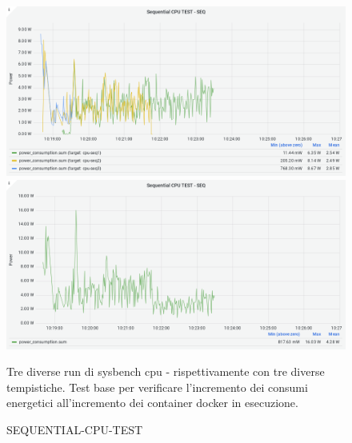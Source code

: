\documentclass[a4paper, 11pt]{article}
\begin{document}
\begin{figure}[h]
\caption{SEQUENTIAL-CPU-TEST}
\centering
\includegraphics[scale=0.4]{image25}
\includegraphics[scale=0.4]{image34}
\begin{flushleft}
Tre diverse run di sysbench cpu - rispettivamente con tre diverse tempistiche. Test base per verificare l'incremento dei consumi energetici all'incremento dei container docker in esecuzione.
\end{flushleft}
\end{figure}
\end{document}
